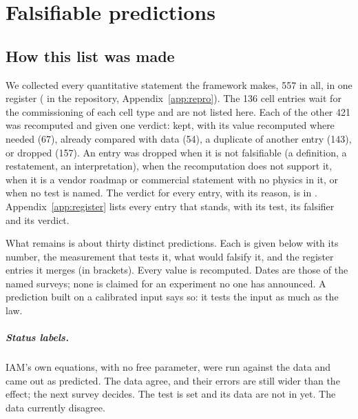 \chapter{Falsifiable predictions}\label{ch:predictions}

\section*{How this list was made}
We collected every quantitative statement the framework makes, 557 in all, in one register ( in the
repository, Appendix~\ref{app:repro}). The 136 cell entries wait for the commissioning of each cell type and are not listed here. Each of the other
421 was recomputed and given one verdict: kept, with its value recomputed where needed (67), already compared with data (54), a duplicate of another entry
(143), or dropped (157). An entry was dropped when it is not falsifiable (a definition, a restatement, an interpretation), when the recomputation
does not support it, when it is a vendor roadmap or commercial statement with no physics in it, or when no test is named. The verdict for every
entry, with its reason, is in .
Appendix~\ref{app:register} lists every entry that stands, with its test, its falsifier and its verdict.

What remains is about thirty distinct predictions. Each is given below with its number, the measurement that tests it, what would falsify it,
and the register entries it merges (in brackets). Every value is recomputed. Dates are those of the named surveys; none is claimed for an
experiment no one has announced. A prediction built on a calibrated input says so: it tests the input as much as the law.

\paragraph{Status labels.} \Spassed{} IAM's own equations, with no free parameter, were run against the data and came out as predicted.
\Sprecision{} The data agree, and their errors are still wider than the effect; the next survey decides. \Spending{} The test is set and its data
are not in yet. \Stension{} The data currently disagree.

